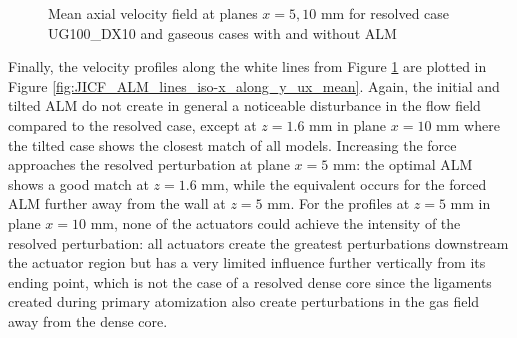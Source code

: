 \clearpage

\begin{figure}[h!]	
	\centering	{}
	\caption{Mean axial velocity field at planes $x = 5, 10$ mm for resolved case UG100\_DX10 and gaseous cases with and without ALM}
	\label{fig:ALM_gas_fields_plane_x}
\end{figure}

\clearpage

Finally, the velocity profiles along the white lines from Figure \ref{fig:ALM_gas_fields_plane_x} are plotted in Figure \ref{fig:JICF_ALM_lines_iso-x_along_y_ux_mean}. Again, the initial and tilted ALM do not create in general a noticeable disturbance in the flow field compared to the resolved case, except at $z = 1.6$ mm in plane $x = 10$ mm where the tilted case shows the closest match of all models. Increasing the force approaches the resolved perturbation at plane $x = 5$ mm: the optimal ALM shows a good match at $z = 1.6$ mm, while the equivalent occurs for the forced ALM further away from the wall at $z = 5$ mm. For the profiles at $z = 5$ mm in plane $x = 10$ mm, none of the actuators could achieve the intensity of the resolved perturbation: all actuators create the greatest perturbations downstream the actuator region but has a very limited influence further vertically from its ending point, which is not the case of a resolved dense core since the ligaments created during primary atomization also create perturbations in the gas field away from the dense core. 




